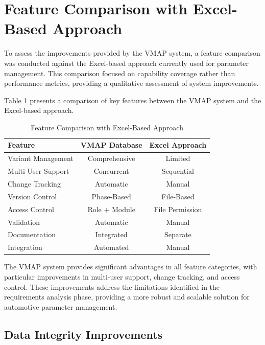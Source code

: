 \section{Feature Comparison with Excel-Based Approach}
\label{sec:feature-comparison-excel}

To assess the improvements provided by the VMAP system, a feature comparison was conducted against the Excel-based approach currently used for parameter management. This comparison focused on capability coverage rather than performance metrics, providing a qualitative assessment of system improvements.

Table \ref{tab:feature-comparison} presents a comparison of key features between the VMAP system and the Excel-based approach.

\begin{table}[h]
\centering
\caption{Feature Comparison with Excel-Based Approach}
\label{tab:feature-comparison}
\begin{tabular}{|l|c|c|}
\hline
\textbf{Feature} & \textbf{VMAP Database} & \textbf{Excel Approach} \\
\hline
Variant Management & Comprehensive & Limited \\
\hline
Multi-User Support & Concurrent & Sequential \\
\hline
Change Tracking & Automatic & Manual \\
\hline
Version Control & Phase-Based & File-Based \\
\hline
Access Control & Role + Module & File Permission \\
\hline
Validation & Automatic & Manual \\
\hline
Documentation & Integrated & Separate \\
\hline
Integration & Automated & Manual \\
\hline
\end{tabular}
\end{table}

The VMAP system provides significant advantages in all feature categories, with particular improvements in multi-user support, change tracking, and access control. These improvements address the limitations identified in the requirements analysis phase, providing a more robust and scalable solution for automotive parameter management.

\subsection{Data Integrity Improvements}
\label{subsec:data-integrity-improvements}

